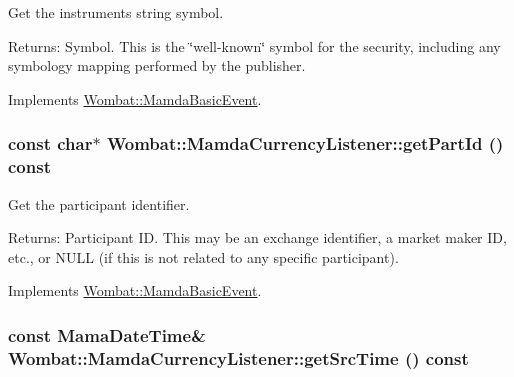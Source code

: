 Get the instruments string symbol. 

\begin{Desc}
\item[Returns:]Symbol. This is the \char`\"{}well-known\char`\"{} symbol for the security, including any symbology mapping performed by the publisher. \end{Desc}


Implements \hyperlink{classWombat_1_1MamdaBasicEvent_8783b136a1305d21c578ced8618c090b}{Wombat::Mamda\-Basic\-Event}.\hypertarget{classWombat_1_1MamdaCurrencyListener_2a5ec025f8c088274a68563ebe51f063}{
\subsubsection[getPartId]{\setlength{\rightskip}{0pt plus 5cm}const char$\ast$ Wombat::Mamda\-Currency\-Listener::get\-Part\-Id () const}}
\label{classWombat_1_1MamdaCurrencyListener_2a5ec025f8c088274a68563ebe51f063}


Get the participant identifier. 

\begin{Desc}
\item[Returns:]Participant ID. This may be an exchange identifier, a market maker ID, etc., or NULL (if this is not related to any specific participant). \end{Desc}


Implements \hyperlink{classWombat_1_1MamdaBasicEvent_94e531c6ae9ae7798725db14facbd6e2}{Wombat::Mamda\-Basic\-Event}.\hypertarget{classWombat_1_1MamdaCurrencyListener_04fcdfcdc9376b9a0daf71773e28b58e}{
\subsubsection[getSrcTime]{\setlength{\rightskip}{0pt plus 5cm}const Mama\-Date\-Time\& Wombat::Mamda\-Currency\-Listener::get\-Src\-Time () const}}
\label{classWombat_1_1MamdaCurrencyListener_04fcdfcdc9376b9a0daf71773e28b58e}


